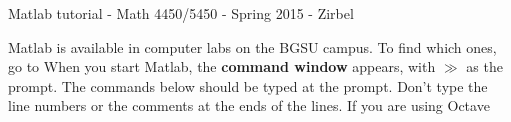 
\usepackage{hyperref}              %



\renewcommand{\baselinestretch}{1.1}

\begin{center} {\sc
Matlab tutorial - Math 4450/5450 - Spring 2015 - Zirbel}\\
\end{center}

\renewcommand{\blist}[1]{\begin{list}{{\arabic{enumi}:}}{\usecounter{enumi}\setlength{\itemsep}{#1}}}
\renewcommand{\elist}{\end{list}}

Matlab is available in computer labs on the BGSU campus.
To find which ones, go to 
When you start Matlab, the {\bf command window} appears, with $\gg$ as the prompt.
The commands below should be typed at the prompt.
Don't type the line numbers or the comments at the ends of the lines.
If you are using Octave

